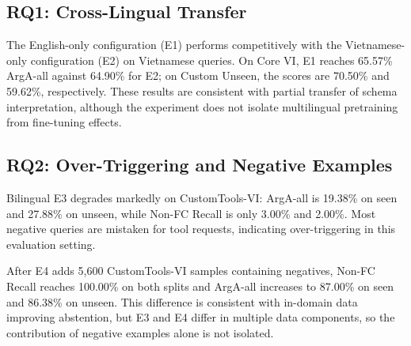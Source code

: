 \documentclass[10pt,twocolumn,a4paper]{article}
\begin{document}
\begin{table}[htbp]
\begin{tabular*}{\textwidth}{@{\extracolsep{\fill}}lcccc@{}}
        \bottomrule
    \end{tabular*}
    \par\medskip
\end{table}

\subsection{RQ1: Cross-Lingual Transfer}
The English-only configuration (E1) performs competitively with the Vietnamese-only configuration (E2) on Vietnamese queries. On Core VI, E1 reaches 65.57\% ArgA-all against 64.90\% for E2; on Custom Unseen, the scores are 70.50\% and 59.62\%, respectively. These results are consistent with partial transfer of schema interpretation, although the experiment does not isolate multilingual pretraining from fine-tuning effects.

\subsection{RQ2: Over-Triggering and Negative Examples}
Bilingual E3 degrades markedly on CustomTools-VI: ArgA-all is 19.38\% on seen and 27.88\% on unseen, while Non-FC Recall is only 3.00\% and 2.00\%. Most negative queries are mistaken for tool requests, indicating over-triggering in this evaluation setting.

After E4 adds 5,600 CustomTools-VI samples containing negatives, Non-FC Recall reaches 100.00\% on both splits and ArgA-all increases to 87.00\% on seen and 86.38\% on unseen. This difference is consistent with in-domain data improving abstention, but E3 and E4 differ in multiple data components, so the contribution of negative examples alone is not isolated.
\end{document}
